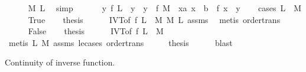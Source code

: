 \begin{isabellebody}
\ \ \ \ \isamarkupfalse%
\ M\ L\ \isamarkupfalse%
\ simp\isanewline
\ \ \isamarkupfalse%
\isanewline
\ \ \isamarkupfalse%
\ {\isachardoublequoteopen}{\isacharparenleft}{\kern0pt}{\isasymforall}y{\isachardot}{\kern0pt}\ f\ L\ {\isasymle}\ y\ {\isasymand}\ y\ {\isasymle}\ f\ M\ {\isasymlongrightarrow}\ {\isacharparenleft}{\kern0pt}{\isasymexists}x{\isasymge}a{\isachardot}{\kern0pt}\ x\ {\isasymle}\ b\ {\isasymand}\ f\ x\ {\isacharequal}{\kern0pt}\ y{\isacharparenright}{\kern0pt}{\isacharparenright}{\kern0pt}{\isachardoublequoteclose}\isanewline
\ \ \isamarkupfalse%
\ {\isacharparenleft}{\kern0pt}cases\ {\isachardoublequoteopen}L\ {\isasymle}\ M{\isachardoublequoteclose}{\isacharparenright}{\kern0pt}\isanewline
\ \ \ \ \isamarkupfalse%
\ True\ \isamarkupfalse%
\ \isamarkupfalse%
\ {\isacharquery}{\kern0pt}thesis\isanewline
\ \ \ \ \isamarkupfalse%
\ IVT{\isacharbrackleft}{\kern0pt}of\ f\ L\ {\isacharunderscore}{\kern0pt}\ M{\isacharbrackright}{\kern0pt}\ M\ L\ assms\ \isamarkupfalse%
\ {\isacharparenleft}{\kern0pt}metis\ order{\isachardot}{\kern0pt}trans{\isacharparenright}{\kern0pt}\isanewline
\ \ \isamarkupfalse%
\isanewline
\ \ \ \ \isamarkupfalse%
\ False\ \isamarkupfalse%
\ \isamarkupfalse%
\ {\isacharquery}{\kern0pt}thesis\isanewline
\ \ \ \ \isamarkupfalse%
\ IVT{}{\isacharbrackleft}{\kern0pt}of\ f\ L\ {\isacharunderscore}{\kern0pt}\ M{\isacharbrackright}{\kern0pt}\isanewline
\ \ \ \ \isamarkupfalse%
\ {\isacharparenleft}{\kern0pt}metis\ L{\isacharparenleft}{\kern0pt}{}{\isacharparenright}{\kern0pt}\ M{\isacharparenleft}{\kern0pt}{}{\isacharparenright}{\kern0pt}\ assms{\isacharparenleft}{\kern0pt}{}{\isacharparenright}{\kern0pt}\ le{\isacharunderscore}{\kern0pt}cases\ order{\isachardot}{\kern0pt}trans{\isacharparenright}{\kern0pt}\isanewline
{}\isamarkupfalse%
\isanewline
\ \ \isamarkupfalse%
\ \isamarkupfalse%
\ {\isacharquery}{\kern0pt}thesis\isanewline
\ \ \ \ \isamarkupfalse%
\ blast\isanewline
{}\isamarkupfalse%
%
\endisatagproof
{\isafoldproof}%
%
\isadelimproof
%
\endisadelimproof
%
\begin{isamarkuptext}%
Continuity of inverse function.%
\end{isamarkuptext}\isamarkuptrue%

\end{isabellebody}
